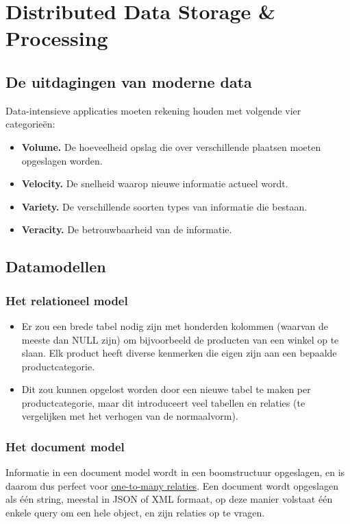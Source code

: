 \part{Distributed Data Storage \& Processing}
	\chapter{De uitdagingen van moderne data}
	Data-intensieve applicaties moeten rekening houden met volgende vier categorieën:
	\begin{itemize}
		\item \textbf{Volume.} De hoeveelheid opslag die over verschillende plaatsen moeten opgeslagen worden.
		\item \textbf{Velocity.} De snelheid waarop nieuwe informatie actueel wordt.
		\item \textbf{Variety.} De verschillende soorten types van informatie die bestaan. 
		\item \textbf{Veracity.} De betrouwbaarheid van de informatie. 
	\end{itemize}
	\chapter{Datamodellen}
	\section{Het relationeel model}
	\begin{itemize}
		\item[\alert] Er zou een brede tabel nodig zijn met honderden kolommen (waarvan de meeste dan NULL zijn) om bijvoorbeeld de producten van een winkel op te slaan. Elk product heeft diverse kenmerken die eigen zijn aan een bepaalde productcategorie.
		\item[\alert] Dit zou kunnen opgelost worden door een nieuwe tabel te maken per productcategorie, maar dit introduceert veel tabellen en relaties (te vergelijken met het verhogen van de normaalvorm).
	\end{itemize}
	\section{Het document model}
	Informatie in een document model wordt in een boomstructuur opgeslagen, en is daarom dus perfect voor \underline{one-to-many relaties}. Een document wordt opgeslagen als één string, meestal in JSON of XML formaat, op deze manier volstaat één enkele query om een hele object, en zijn relaties op te vragen. 

